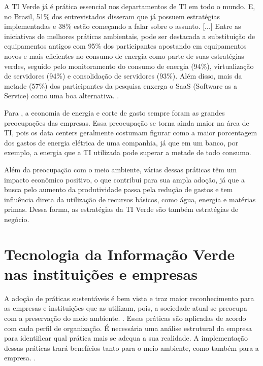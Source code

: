 \begin{citacao}
A TI Verde já é prática essencial nos departamentos de TI em todo o mundo. E, no Brasil, 51\% dos entrevistados disseram que já possuem estratégias implementadas e 38\% estão começando a falar sobre o assunto. [...] Entre as iniciativas de melhores práticas ambientais, pode ser destacada a substituição de equipamentos antigos com 95\% dos participantes apostando em equipamentos novos e mais eficientes no consumo de energia como parte de suas estratégias verdes, seguido pelo monitoramento do consumo de energia (94\%), virtualização de servidores (94\%) e consolidação de servidores (93\%). Além disso, mais da metade (57\%) dos participantes da pesquisa enxerga o SaaS (Software as a Service) como uma boa alternativa. \cite{ferreira2009tiverde}.
\end{citacao} 

Para , a economia de energia e corte de gasto sempre foram as grandes preocupações das empresas. Essa preocupação se torna ainda maior na área de TI, pois os data centers geralmente costumam figurar como a maior porcentagem dos gastos de energia elétrica de uma companhia, já que em um banco, por exemplo, a energia que a TI utilizada pode superar a metade de todo consumo.  

Além da preocupação com o meio ambiente, várias dessas práticas têm um impacto econômico positivo, o que contribui para sua ampla adoção, já que a busca pelo aumento da produtividade passa pela redução de gastos e tem influência direta da utilização de recursos básicos, como água, energia e matérias primas. Dessa forma, as estratégias da TI Verde são também estratégias de negócio.


\section{Tecnologia da Informação Verde nas instituições e empresas}

A adoção de práticas sustentáveis é bem vista e traz maior reconhecimento para as empresas e instituições que as utilizam, pois, a sociedade atual se preocupa com a preservação do meio ambiente. \cite{abreu2012ti}. Essas práticas são aplicadas de acordo com cada perfil de organização. É necessária uma análise estrutural da empresa para identificar qual prática mais se adequa a sua realidade. A implementação dessas práticas trará benefícios tanto para o meio ambiente, como também para a empresa. \cite{pinto2011estudo}.

